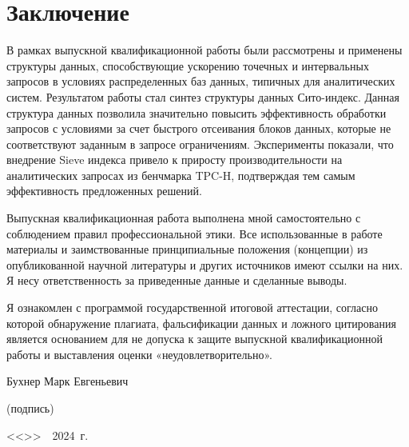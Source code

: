 \section*{Заключение}

В рамках выпускной квалификационной работы были рассмотрены и применены структуры данных, способствующие ускорению точечных и интервальных запросов в условиях распределенных баз данных, типичных для аналитических систем. Результатом работы стал синтез структуры данных Сито-индекс. Данная структура данных позволила значительно повысить эффективность обработки запросов с условиями за счет быстрого отсеивания блоков данных, которые не соответствуют заданным в запросе ограничениям. Эксперименты показали, что внедрение Sieve индекса привело к приросту производительности на аналитических запросах из бенчмарка TPC-H, подтверждая тем самым  эффективность предложенных решений.

Выпускная квалификационная работа выполнена мной самостоятельно с соблюдением правил профессиональной этики. Все использованные в работе материалы и заимствованные принципиальные положения (концепции) из опубликованной научной литературы и других источников имеют ссылки на них. Я несу ответственность за приведенные данные и сделанные выводы.

Я ознакомлен с программой государственной итоговой аттестации, согласно которой обнаружение плагиата, фальсификации данных и ложного цитирования является основанием для не допуска к защите выпускной квалификационной работы и выставления оценки «неудовлетворительно».

\vspace{3em}
\noindent
Бухнер Марк Евгеньевич \hspace*{\fill} \makebox[5cm]{\hrulefill}\\
\vspace{-3em}
\begin{flushright}
			\footnotesize (подпись)~~~~~~~~~~~~~~~
\end{flushright}

\noindent
<<\makebox[0.7cm]{\hrulefill}>>~\makebox[3cm]{\hrulefill}~2024~г. 
